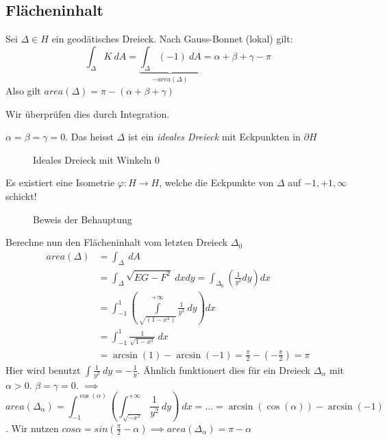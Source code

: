 \documentclass[../main.tex]{subfiles}
\begin{document}
\subsection*{Flächeninhalt}
Sei $\Delta \in H$ ein geodätisches Dreieck. Nach Gauss-Bonnet (lokal) gilt:
$$\int_{\Delta}K \ dA = \underbrace{\int _{\Delta} (-1)\ dA}_{- area(\Delta)} = \alpha + \beta + \gamma - \pi$$
Also gilt $area(\Delta)=\pi - (\alpha + \beta + \gamma)$

Wir überprüfen dies durch Integration.
\begin{specialcase}
    $\alpha = \beta = \gamma = 0$. Das heisst $\Delta$ ist ein \emph{ideales Dreieck}
    mit Eckpunkten in $\partial H$
\end{specialcase}
\begin{figure}[htb]
    \centering
    \def\svgwidth{10em}
    
    \caption*{Ideales Dreieck mit Winkeln 0}        
\end{figure}

\begin{claim}
    Es existiert eine Isometrie $\varphi : H \to H$, welche die Eckpunkte von $\Delta$ auf $-1,+1,\infty$ schickt!
\end{claim}
\begin{figure}[htb]
    \centering
    \def\svgwidth{35em}
    
    \caption{Beweis der Behauptung}        
\end{figure}

Berechne nun den Flächeninhalt vom letzten Dreieck $\Delta _0$
\begin{align*}
    area(\Delta)&= \int_{\Delta} \ dA \\
    &= \int _{\Delta}\sqrt{EG-F^2}\ dxdy = \int_{\Delta_0}\left(\frac{1}{y^2}dy \right)dx\\
    &= \int _{-1}^{1}\left( \int \limits_{\sqrt{(1-x^2)}}^{+\infty} \frac{1}{y^2}\ dy\right) dx \\
    &= \int _{-1}^{1} \frac{1}{\sqrt{1-x^2}}\ dx \\
    &= \arcsin(1)-\arcsin(-1) = \frac{\pi}{2}-(-\frac{\pi}{2})=\pi
\end{align*}
Hier wird benutzt $\int \frac{1}{y^2} \ dy = -\frac{1}{y}$.
Ähnlich funktionert dies für ein Dreieck $\Delta _{\alpha}$ mit $\alpha >0$.
$\beta = \gamma = 0$.
$\implies$ $$area(\Delta_\alpha)= \int _{-1}^{\cos(\alpha)}(\int_{\sqrt{-x^2}}^{+\infty}\frac{1}{y^2} \ dy) \ dx = \dots = \arcsin(\cos(\alpha))-\arcsin(-1)$$.
Wir nutzen $cos \alpha = sin(\frac{\pi}{2}-\alpha) \implies area(\Delta _{\alpha})= \pi - \alpha$
\end{document}

